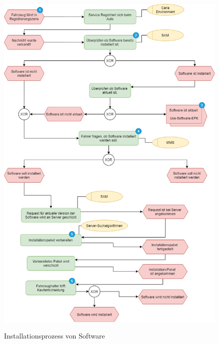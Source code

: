 \begin{figure}[!h]
	\centering
	\includegraphics[width=0.86\columnwidth]{pictures/konzept-Installationsprozess.png}
	\label{img:installationsProtokollExtern}
	\caption{Installationsprozess von Software}
\end{figure}
